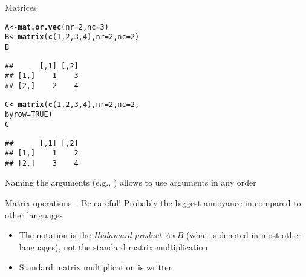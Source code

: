 \documentclass[aspectratio=169]{beamer}\usepackage[]{graphicx}\usepackage[]{xcolor}
\makeatletter
\newcommand{\hlnum}[1]{\textcolor[rgb]{0.686,0.059,0.569}{#1}}%
\newcommand{\hldef}[1]{\textcolor[rgb]{0.345,0.345,0.345}{#1}}%
\newcommand{\hlkwb}[1]{\textcolor[rgb]{0.69,0.353,0.396}{#1}}%
\newcommand{\hlkwc}[1]{\textcolor[rgb]{0.333,0.667,0.333}{#1}}%
\newcommand{\hlkwd}[1]{\textcolor[rgb]{0.737,0.353,0.396}{\textbf{#1}}}%
\newenvironment{kframe}{%
 \def\at@end@of@kframe{}%
 \ifinner\ifhmode%
  \def\at@end@of@kframe{\end{minipage}}%
  \begin{minipage}{\columnwidth}%
 \fi\fi%
 \def\FrameCommand##1{\hskip\@totalleftmargin \hskip-\fboxsep
 \colorbox{shadecolor}{##1}\hskip-\fboxsep
     \hskip-\linewidth \hskip-\@totalleftmargin \hskip\columnwidth}%
 \MakeFramed {\advance\hsize-\width
   \@totalleftmargin\z@ \linewidth\hsize
   \@setminipage}}%
 {\par\unskip\endMakeFramed%
 \at@end@of@kframe}
\newenvironment{knitrout}{}{} %
\makeatother
\begin{document}
\begin{frame}[fragile]{Matrices}
\begin{knitrout}
\color{fgcolor}\begin{kframe}
\begin{alltt}
\hldef{A} \hlkwb{<-} \hlkwd{mat.or.vec}\hldef{(}\hlkwc{nr} \hldef{=} \hlnum{2}\hldef{,} \hlkwc{nc} \hldef{=} \hlnum{3}\hldef{)}
\hldef{B} \hlkwb{<-} \hlkwd{matrix}\hldef{(}\hlkwd{c}\hldef{(}\hlnum{1}\hldef{,}\hlnum{2}\hldef{,}\hlnum{3}\hldef{,}\hlnum{4}\hldef{),} \hlkwc{nr} \hldef{=} \hlnum{2}\hldef{,} \hlkwc{nc} \hldef{=} \hlnum{2}\hldef{)}
\hldef{B}
\end{alltt}
\begin{verbatim}
##      [,1] [,2]
## [1,]    1    3
## [2,]    2    4
\end{verbatim}
\begin{alltt}
\hldef{C} \hlkwb{<-} \hlkwd{matrix}\hldef{(}\hlkwd{c}\hldef{(}\hlnum{1}\hldef{,}\hlnum{2}\hldef{,}\hlnum{3}\hldef{,}\hlnum{4}\hldef{),} \hlkwc{nr} \hldef{=} \hlnum{2}\hldef{,} \hlkwc{nc} \hldef{=} \hlnum{2}\hldef{,}
            \hlkwc{byrow} \hldef{=} \hlnum{TRUE}\hldef{)}
\hldef{C}
\end{alltt}
\begin{verbatim}
##      [,1] [,2]
## [1,]    1    2
## [2,]    3    4
\end{verbatim}
\end{kframe}
\end{knitrout}
Naming the arguments (e.g., ) allows to use arguments in any order
\end{frame} 

\begin{frame}{Matrix operations -- Be careful!}
Probably the biggest annoyance in  compared to other languages
\vfill
\begin{itemize}
\item The notation  is the \emph{Hadamard product} $A\circ B$ (what is denoted  in most other languages), not the standard matrix multiplication
\vfill
\item Standard matrix multiplication is written 
\end{itemize}
\end{frame} 
\end{document}
